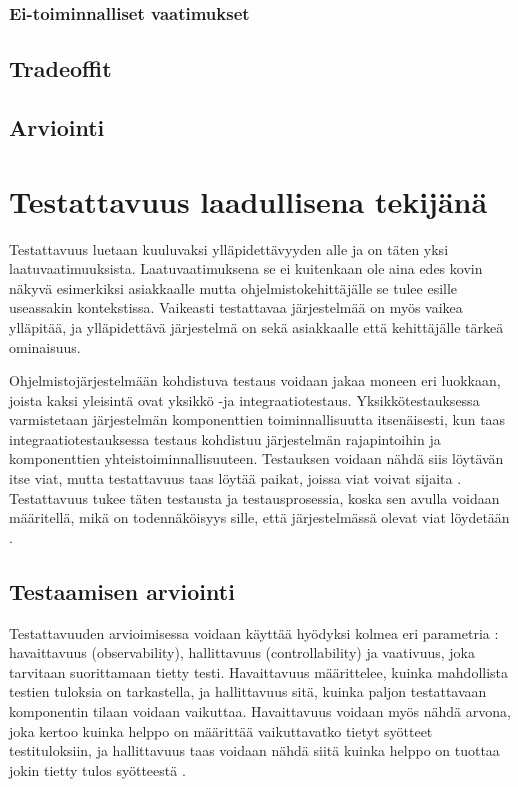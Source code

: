 \documentclass[finnish]{tktltiki2}
\theoremstyle{definition}
\theoremstyle{remark}
\begin{document}
\subsubsection{Ei-toiminnalliset vaatimukset}
\subsection{Tradeoffit}
\subsection{Arviointi}


\section{Testattavuus laadullisena tekijänä}
Testattavuus luetaan kuuluvaksi ylläpidettävyyden alle \citep{ISO/IEC25010:2011} ja on täten yksi laatuvaatimuuksista. Laatuvaatimuksena se ei kuitenkaan ole aina edes kovin näkyvä esimerkiksi asiakkaalle mutta ohjelmistokehittäjälle se tulee esille useassakin kontekstissa. Vaikeasti testattavaa järjestelmää on myös vaikea ylläpitää, ja ylläpidettävä järjestelmä on sekä asiakkaalle että kehittäjälle tärkeä ominaisuus.

Ohjelmistojärjestelmään kohdistuva testaus voidaan jakaa moneen eri luokkaan, joista kaksi yleisintä ovat yksikkö -ja integraatiotestaus. Yksikkötestauksessa varmistetaan järjestelmän komponenttien toiminnallisuutta itsenäisesti, kun taas integraatiotestauksessa testaus kohdistuu järjestelmän rajapintoihin ja komponenttien yhteistoiminnallisuuteen. Testauksen voidaan nähdä siis löytävän itse viat, mutta testattavuus taas löytää paikat, joissa viat voivat sijaita \citep[s. 19]{Voas:1995:STN:624607.625469}. Testattavuus tukee täten testausta ja testausprosessia, koska sen avulla voidaan määritellä, mikä on todennäköisyys sille, että järjestelmässä olevat viat löydetään \citep[s. 114]{voas_improving_1992}. 


\subsection{Testaamisen arviointi}

Testattavuuden arvioimisessa voidaan käyttää hyödyksi kolmea eri parametria \citep[s. 2]{baudry_measuring_2003}: havaittavuus (observability), hallittavuus (controllability) ja vaativuus, joka tarvitaan suorittamaan tietty testi. Havaittavuus määrittelee, kuinka mahdollista testien tuloksia on tarkastella, ja hallittavuus sitä, kuinka paljon testattavaan komponentin tilaan voidaan vaikuttaa. Havaittavuus voidaan myös nähdä arvona, joka kertoo kuinka helppo on määrittää vaikuttavatko tietyt syötteet testituloksiin, ja hallittavuus taas voidaan nähdä siitä kuinka helppo on tuottaa jokin tietty tulos syötteestä \citep[s. 554]{Freedman:1991:TSC:126218.126229}. 
\end{document}
